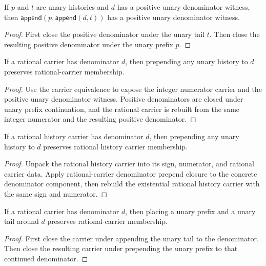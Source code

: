 \begin{theorem}
\label{thm:rat-positive-denominator-append-unary-context}
If $p$ and $t$ are unary histories and $d$ has a positive unary denominator
witness, then $\mathsf{append}(p,\mathsf{append}(d,t))$ has a positive unary
denominator witness.
\end{theorem}
\begin{proof}
First close the positive denominator under the unary tail $t$. Then close the
resulting positive denominator under the unary prefix $p$.
\end{proof}

\begin{theorem}
\label{thm:rat-carrier-prepend-unary-denominator-closed}
If a rational carrier has denominator \(d\), then prepending any unary history
to \(d\) preserves rational-carrier membership.
\end{theorem}
\begin{proof}
Use the carrier equivalence to expose the integer numerator carrier and the
positive unary denominator witness. Positive denominators are closed under
unary prefix continuation, and the rational carrier is rebuilt from the same
integer numerator and the resulting positive denominator.
\end{proof}

\begin{theorem}
\label{thm:rat-history-carrier-prepend-unary-denominator-closed}
If a rational history carrier has denominator \(d\), then prepending any unary
history to \(d\) preserves rational history carrier membership.
\end{theorem}
\begin{proof}
Unpack the rational history carrier into its sign, numerator, and rational
carrier data. Apply rational-carrier denominator prepend closure to the
concrete denominator component, then rebuild the existential rational history
carrier with the same sign and numerator.
\end{proof}

\begin{theorem}
\label{thm:rat-carrier-unary-denominator-context-closed}
If a rational carrier has denominator \(d\), then placing a unary prefix and a
unary tail around \(d\) preserves rational-carrier membership.
\end{theorem}
\begin{proof}
First close the carrier under appending the unary tail to the denominator.
Then close the resulting carrier under prepending the unary prefix to that
continued denominator.
\end{proof}

